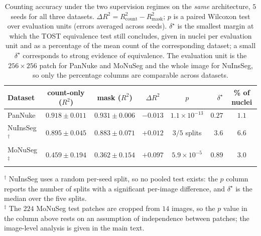 \documentclass[preprint,12pt]{elsarticle}
\begin{document}
\begin{table}[!htbp]
\centering
\caption{Counting accuracy under the two supervision regimes on the \emph{same} architecture, $5$ seeds for all
three datasets. $\Delta R^2 = R^2_{\text{count}} - R^2_{\text{mask}}$; $p$ is a paired Wilcoxon test over
evaluation units (errors averaged across seeds). $\delta^\star$ is the smallest margin at which the TOST
equivalence test still concludes, given in nuclei per evaluation unit and as a percentage of the mean count of
the corresponding dataset; a small $\delta^\star$ corresponds to strong evidence of equivalence. The evaluation
unit is the $256\times256$ patch for PanNuke and MoNuSeg and the whole image for NuInsSeg, so only the
percentage columns are comparable across datasets.}\label{tab:parity}
\small
\setlength{\tabcolsep}{4pt}
\begin{tabular}{@{}lccccrc@{}}
\toprule
Dataset & count-only ($R^2$) & mask ($R^2$) & $\Delta R^2$ & $p$ & $\delta^\star$ & \% of nuclei \\
\midrule
PanNuke & $0.918\pm0.011$ & $0.931\pm0.006$ & $-0.013$ & $1.1{\times}10^{-13}$ & $0.27$ & $1.1$ \\
NuInsSeg$^{\dagger}$ & $0.895\pm0.045$ & $0.883\pm0.071$ & $+0.012$ & $3/5$ splits & $3.6$ & $6.6$ \\
MoNuSeg$^{\ddagger}$ & $0.459\pm0.194$ & $0.362\pm0.154$ & $+0.097$ & $5.9{\times}10^{-5}$ & $0.89$ & $3.0$ \\
\bottomrule
\end{tabular}

\vspace{4pt}
\begin{minipage}{\textwidth}\footnotesize
$^{\dagger}$ NuInsSeg uses a random per-seed split, so no pooled test exists: the $p$ column reports the number
of splits with a significant per-image difference, and $\delta^\star$ is the median over the five splits.\\
$^{\ddagger}$ The $224$ MoNuSeg test patches are cropped from $14$ images, so the $p$ value in the column above
rests on an assumption of independence between patches; the image-level analysis is given in the main text.
\end{minipage}
\end{table}
\end{document}
